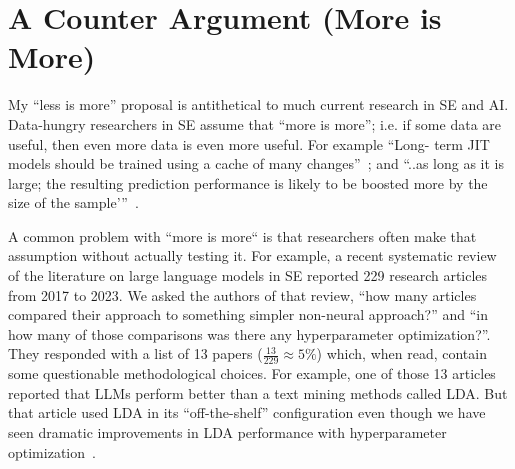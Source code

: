 \documentclass[sigconf,screen]{acmart}
\begin{document}
\section{A Counter Argument (More is More)}
 


My ``less is more'' proposal is  antithetical to much current research in SE and AI.
Data-hungry researchers
in SE assume that ``more is more''; i.e.
if some data are useful, then even more data is even more useful.
For example
``Long-
term JIT models should be trained using a cache of many
changes''~\cite{amasaki2020cross}; and 
``..as long as it is large; the resulting prediction
performance is likely to be boosted more by the size of the
sample'”~\cite{rahman2014comparing}.

A common problem with ``more is more`` is that researchers
often make that assumption without actually testing it.
For example, a recent systematic review~\cite{hou2023large} of the literature on large language models in SE reported 229 research articles from 2017 to 2023. We asked the authors
of that review,  
``how many articles compared their approach to something simpler
non-neural approach?'' and ``in how many of those comparisons
was there any hyperparameter optimization?''. They responded with
a list of 13 papers (\mbox{$\frac{13}{229}\approx 5\%$}) which,
when read, contain some questionable methodological choices. For example,
one of those 13 articles reported that LLMs perform
better than a text mining methods called LDA. But that article used LDA in its ``off-the-shelf'' configuration even though we have seen dramatic improvements in LDA performance with hyperparameter optimization~\cite{agrawal2019dodge,agrawal2018wrong}.
\end{document}
